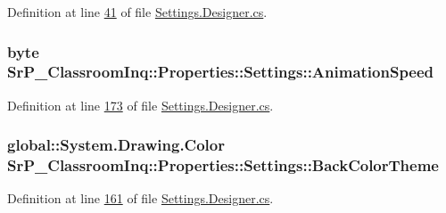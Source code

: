\-Definition at line \hyperlink{_settings_8_designer_8cs_source_l00041}{41} of file \hyperlink{_settings_8_designer_8cs_source}{\-Settings.\-Designer.\-cs}.

\hypertarget{class_sr_p___classroom_inq_1_1_properties_1_1_settings_ac3c244809dca166ec8ee4bf7eb419623}{
\subsubsection[{\-Animation\-Speed}]{\setlength{\rightskip}{0pt plus 5cm}byte \-Sr\-P\-\_\-\-Classroom\-Inq\-::\-Properties\-::\-Settings\-::\-Animation\-Speed}}
\label{class_sr_p___classroom_inq_1_1_properties_1_1_settings_ac3c244809dca166ec8ee4bf7eb419623}


\-Definition at line \hyperlink{_settings_8_designer_8cs_source_l00173}{173} of file \hyperlink{_settings_8_designer_8cs_source}{\-Settings.\-Designer.\-cs}.

\hypertarget{class_sr_p___classroom_inq_1_1_properties_1_1_settings_af26cf7b47cfa1a668ce1ebeac8941a18}{
\subsubsection[{\-Back\-Color\-Theme}]{\setlength{\rightskip}{0pt plus 5cm}global\-::\-System.\-Drawing.\-Color \-Sr\-P\-\_\-\-Classroom\-Inq\-::\-Properties\-::\-Settings\-::\-Back\-Color\-Theme}}
\label{class_sr_p___classroom_inq_1_1_properties_1_1_settings_af26cf7b47cfa1a668ce1ebeac8941a18}


\-Definition at line \hyperlink{_settings_8_designer_8cs_source_l00161}{161} of file \hyperlink{_settings_8_designer_8cs_source}{\-Settings.\-Designer.\-cs}.

